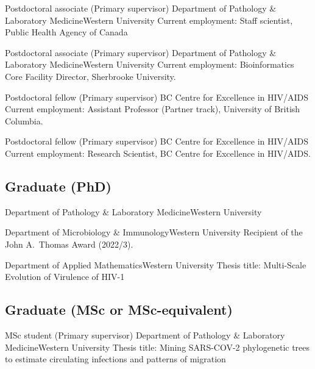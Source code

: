 {Postdoctoral associate (Primary supervisor)}
{Department of Pathology \& Laboratory Medicine}{Western University}
{Current employment: Staff scientist, Public Health Agency of Canada}


{Postdoctoral associate (Primary supervisor)}
{Department of Pathology \& Laboratory Medicine}{Western University}
{Current employment: Bioinformatics Core Facility Director, Sherbrooke University.}

{Postdoctoral fellow (Primary supervisor)}
{BC Centre for Excellence in HIV/AIDS}{}
{Current employment: Assistant Professor (Partner track), University of British Columbia.}

{Postdoctoral fellow (Primary supervisor)}
{BC Centre for Excellence in HIV/AIDS}{}
{Current employment: Research Scientist, BC Centre for Excellence in HIV/AIDS.}



\subsection {Graduate (PhD)}

{Department of Pathology \& Laboratory Medicine}{Western University}
{}

{Department of Microbiology \& Immunology}{Western University}
{Recipient of the John A.~Thomas Award (2022/3).}

{Department of Applied Mathematics}{Western University}
{Thesis title: Multi-Scale Evolution of Virulence of HIV-1}



\subsection {Graduate (MSc or MSc-equivalent)}

{MSc student (Primary supervisor)}
{Department of Pathology \& Laboratory Medicine}{Western University}
{Thesis title: Mining SARS-COV-2 phylogenetic trees to estimate circulating infections and patterns of migration}

